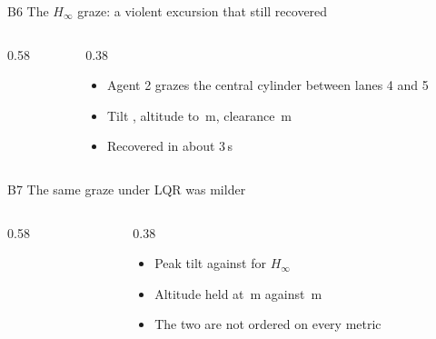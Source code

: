 \documentclass[aspectratio=169,11pt,t]{beamer}
\begin{document}
\begin{frame}{B6 \textperiodcentered{} The $H_\infty$ graze: a violent excursion that still recovered}
  \begin{columns}[T,onlytextwidth]
    \begin{column}{0.58\textwidth}
    \end{column}
    \begin{column}{0.38\textwidth}
      \vskip2mm
      \begin{itemize}\bulletgap\small
        \item Agent 2 grazes the central cylinder between lanes 4 and 5
        \item Tilt \UpPlusHinfTilt\textdegree, altitude to \UpPlusHinfZmin\,m,
              clearance \UpPlusHinfSurf\,m
        \item Recovered in about 3\,s
      \end{itemize}
    \end{column}
  \end{columns}
\end{frame}

\begin{frame}{B7 \textperiodcentered{} The same graze under LQR was milder}
  \begin{columns}[T,onlytextwidth]
    \begin{column}{0.58\textwidth}
    \end{column}
    \begin{column}{0.38\textwidth}
      \vskip2mm
      \begin{itemize}\bulletgap\small
        \item Peak tilt \UpPlusLqrTilt\textdegree{} against
              \UpPlusHinfTilt\textdegree{} for $H_\infty$
        \item Altitude held at \UpPlusLqrZmin\,m against \UpPlusHinfZmin\,m
        \item The two are not ordered on every metric
      \end{itemize}
    \end{column}
  \end{columns}
\end{frame}
\end{document}
